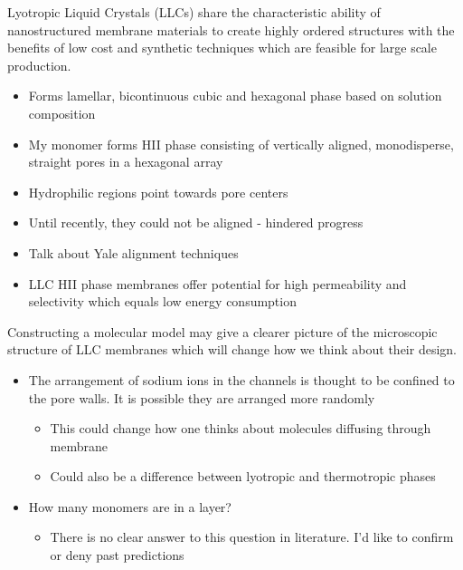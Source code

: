 \documentclass{article}
\begin{document}
	Lyotropic Liquid Crystals (LLCs) share the characteristic ability of nanostructured membrane materials to create highly ordered structures with the benefits of low cost and synthetic techniques which are feasible for large scale production.
	\begin{itemize}
		\item Forms lamellar, bicontinuous cubic and hexagonal phase based on solution composition
		\item My monomer forms HII phase consisting of vertically aligned, monodisperse, straight pores in a hexagonal array
		\item Hydrophilic regions point towards pore centers
		\item Until recently, they could not be aligned - hindered progress
		\item Talk about Yale alignment techniques
		\item LLC HII phase membranes offer potential for high permeability and selectivity which equals low energy consumption
	\end{itemize}
	
	Constructing a molecular model may give a clearer picture of the microscopic structure of LLC membranes which will change how we think about their design.
	\begin{itemize}
		\item The arrangement of sodium ions in the channels is thought to be confined to the pore walls. It is possible they are arranged more randomly
		\begin{itemize}
			\item This could change how one thinks about molecules diffusing through membrane
			\item Could also be a difference between lyotropic and thermotropic phases
		\end{itemize}
		\item How many monomers are in a layer?
		\begin{itemize}
			\item There is no clear answer to this question in literature. I'd like to confirm or deny past predictions
		\end{itemize}
	\end{itemize}
	
\end{document}
